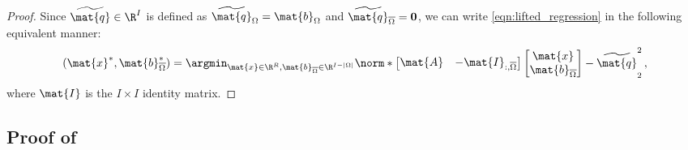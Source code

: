 \begin{proof}
Since $\widetilde{\mat{q}}\in \R^{I}$ is defined as $\widetilde{\mat{q}}_{\Omega} = \mat{b}_{\Omega}$ and $\widetilde{\mat{q}}_{\overline{\Omega}} = \boldsymbol{0}$,
we can write \eqref{eqn:lifted_regression} in the following equivalent manner:
\[
    (\mat{x}^*, \mat{b}^*_{\overline{\Omega}})
    =
    \argmin_{\mat{x} \in \R^R, \mat{b}_{\overline{\Omega}}\in\R^{I-|\Omega|}}
    \norm*{
    \begin{bmatrix}
        \mat{A} & -\mat{I}_{:,\overline{\Omega}}
    \end{bmatrix}
    \begin{bmatrix}
        \mat{x} \\ \mat{b}_{\overline{\Omega}}
    \end{bmatrix}
    -
    \widetilde{\mat{q}}
    }_{2}^2\,,
\]
where $\mat{I}$ is the $I\times I$ identity matrix.
\end{proof}

\subsection{Proof of }

\RichardsonSimulation*

